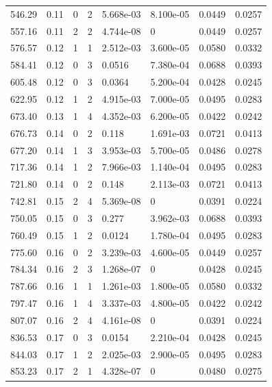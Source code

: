 \documentclass[preview]{standalone}
\begin{document}
{{{\begin{tabular}{L{1.2cm}C{1.2cm} C{0.3cm}C{0.5cm} C{1.4cm}C{1.4cm} C{1.4cm}C{1.4cm}}
  546.29  &  0.11  & 0     &  2 &  5.668e-03  & 8.100e-05  & 0.0449 &  0.0257   \\ 
  557.16  &  0.11  & 2     &  2 &  4.744e-08  & 0  & 0.0449 &  0.0257   \\ 
  576.57  &  0.12  & 1     &  1 &  2.512e-03  & 3.600e-05  & 0.0580 &  0.0332   \\ 
  584.41  &  0.12  & 0     &  3 &  0.0516  & 7.380e-04  & 0.0688 &  0.0393   \\ 
  605.48  &  0.12  & 0     &  3 &  0.0364  & 5.200e-04  & 0.0428 &  0.0245   \\ 
  622.95  &  0.12  & 1     &  2 &  4.915e-03  & 7.000e-05  & 0.0495 &  0.0283   \\ 
  673.40  &  0.13  & 1     &  4 &  4.352e-03  & 6.200e-05  & 0.0422 &  0.0242   \\ 
  676.73  &  0.14  & 0     &  2 &  0.118  & 1.691e-03  & 0.0721 &  0.0413   \\ 
  677.20  &  0.14  & 1     &  3 &  3.953e-03  & 5.700e-05  & 0.0486 &  0.0278   \\ 
  717.36  &  0.14  & 1     &  2 &  7.966e-03  & 1.140e-04  & 0.0495 &  0.0283   \\ 
  721.80  &  0.14  & 0     &  2 &  0.148  & 2.113e-03  & 0.0721 &  0.0413   \\ 
  742.81  &  0.15  & 2     &  4 &  5.369e-08  & 0  & 0.0391 &  0.0224   \\ 
  750.05  &  0.15  & 0     &  3 &  0.277  & 3.962e-03  & 0.0688 &  0.0393   \\ 
  760.49  &  0.15  & 1     &  2 &  0.0124  & 1.780e-04  & 0.0495 &  0.0283   \\ 
  775.60  &  0.16  & 0     &  2 &  3.239e-03  & 4.600e-05  & 0.0449 &  0.0257   \\ 
  784.34  &  0.16  & 2     &  3 &  1.268e-07  & 0  & 0.0428 &  0.0245   \\ 
  787.66  &  0.16  & 1     &  1 &  1.261e-03  & 1.800e-05  & 0.0580 &  0.0332   \\ 
  797.47  &  0.16  & 1     &  4 &  3.337e-03  & 4.800e-05  & 0.0422 &  0.0242   \\ 
  807.07  &  0.16  & 2     &  4 &  4.161e-08  & 0  & 0.0391 &  0.0224   \\ 
  836.53  &  0.17  & 0     &  3 &  0.0154  & 2.210e-04  & 0.0428 &  0.0245   \\ 
  844.03  &  0.17  & 1     &  2 &  2.025e-03  & 2.900e-05  & 0.0495 &  0.0283   \\ 
  853.23  &  0.17  & 2     &  1 &  4.328e-07  & 0  & 0.0480 &  0.0275   \\ 

\end{tabular}}}}
\end{document}
